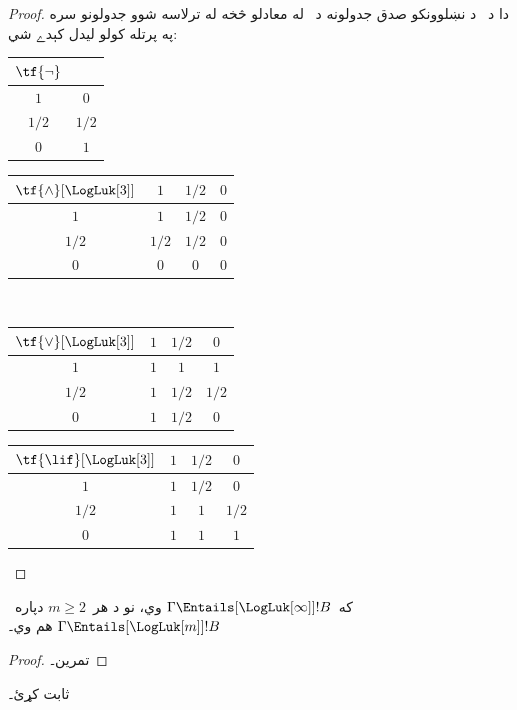 \documentclass[../../../include/open-logic-section]{subfiles}
\begin{document}
\begin{proof}
  دا د~ د نښلوونکو صدق جدولونه
  د~ له معادلو څخه له ترلاسه شوو جدولونو سره
  په پرتله کولو ليدل کېدے شي:
  \begin{center}
    \begin{tabular}{c|c} 
      $\tf{\lnot}$ & \\ 
      \hline  
      $1$ & $0$ \\ 
      $1/2$ & $1/2$ \\
      $0$ & $1$ 
    \end{tabular}
    \quad
    \begin{tabular}{c|ccc} 
      $\tf{\land}[\LogLuk[3]]$ & $1$ & $1/2$ & $0$ \\ 
      \hline 
      $1$ & $1$ & $1/2$ & $0$ \\ 
      $1/2$ & $1/2$ & $1/2$ & $0$\\ 
      $0$ & $0$ & $0$ & $0$ 
    \end{tabular}
    \\[2ex]
    \begin{tabular}{c|ccc} 
      $\tf{\lor}[\LogLuk[3]]$ & $1$ & $1/2$ & $0$ \\ 
      \hline 
      $1$ & $1$ & $1$ & $1$ \\ 
      $1/2$ & $1$ & $1/2$ & $1/2$ \\
      $0$ & $1$ & $1/2$ & $0$ 
    \end{tabular}
    \quad
    \begin{tabular}{c|ccc} 
      $\tf{\lif}[\LogLuk[3]]$ & $1$ & $1/2$ & $0$ \\ 
      \hline 
      $1$ & $1$ & $1/2$ & $0$ \\ 
      $1/2$ & $1$ & $1$ & $1/2$  \\ 
      $0$ & $1$ & $1$ & $1$ 
    \end{tabular}
  \end{center} 
\end{proof}

\begin{prop}
  که~$\Gamma \Entails[\LogLuk[\infty]] !B$ وي، نو د هر~$m \ge 2$
  دپاره~$\Gamma \Entails[\LogLuk[m]] !B$ هم وي۔
\end{prop}

\begin{proof}
  تمرين۔
\end{proof}

\begin{prob}
   ثابت کړئ۔
\end{prob}
\end{document}
